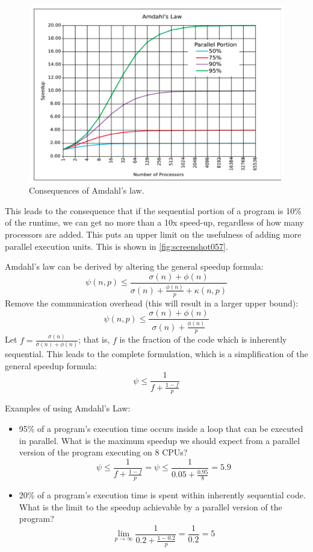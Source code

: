 \begin{figure}
\centering
\includegraphics[width=0.7\linewidth]{screenshot057}
\caption{Consequences of Amdahl's law.}
\label{fig:screenshot057}
\end{figure}

This leads to the consequence that if the sequential portion of a program is 10\% of the runtime, we can get no more than a 10x speed-up, regardless of how many processors are added. This puts an upper limit on the usefulness of adding more parallel execution units.  This is shown in \autoref{fig:screenshot057}.

Amdahl's law can be derived by altering the general speedup formula:
\[ \psi(n,p) \le \frac{\sigma(n) + \phi(n)}{\sigma(n) + \frac{\phi(n)}{p} + \kappa(n, p)} \]
Remove the communication overhead (this will result in a larger upper bound):
\[ \psi(n,p) \le \frac{\sigma(n) + \phi(n)}{\sigma(n) + \frac{\phi(n)}{p}} \]
Let $f = \frac{\sigma(n)}{\sigma(n) + \phi(n)}$; that is, $f$ is the fraction of the code which is inherently sequential. This leads to the complete formulation, which is a simplification of the general speedup formula:
\[ \psi \le \frac{1}{f + \frac{1-f}{p}} \]

Examples of using Amdahl's Law: \begin{itemize}
\item 95\% of a program’s execution time occurs inside a loop that can be executed in parallel. What is the maximum speedup we should expect from a parallel version of the program executing on 8 CPUs? 
\[ \psi \le \frac{1}{f + \frac{1-f}{p}} = \psi \le \frac{1}{0.05 + \frac{0.95}{8}} = 5.9 \]
\item 20\% of a program’s execution time is spent within inherently sequential code. What is the limit to the speedup achievable by a parallel version of the program?
\[ \lim_{p\rightarrow\infty} \frac{1}{0.2 + \frac{1-0.2}{p}} = \frac{1}{0.2} = 5 \]
\end{itemize}

